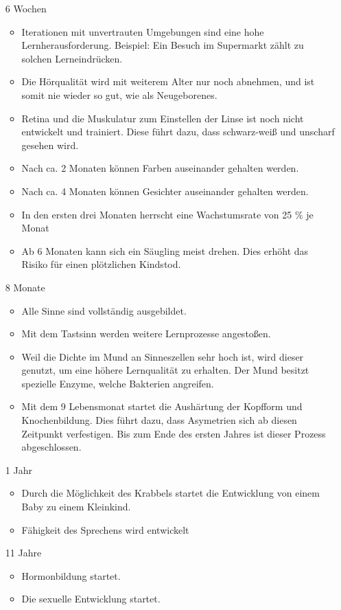 \begin{enumerate}
\begin{itemize}
\begin{itemize}
		\end{itemize}
	\end{itemize}
	\item[6 Wochen]
	\begin{itemize}
		\item Iterationen mit unvertrauten Umgebungen sind eine hohe Lernherausforderung. Beispiel: Ein Besuch im Supermarkt zählt zu solchen Lerneindrücken.
		\item Die Hörqualität wird mit weiterem Alter nur noch abnehmen, und ist somit nie wieder so gut, wie als Neugeborenes.
		\item Retina und die Muskulatur zum Einstellen der Linse ist noch nicht entwickelt und trainiert. Diese führt dazu, dass schwarz-weiß und unscharf gesehen wird.
		\item Nach ca. 2 Monaten können Farben auseinander gehalten werden.
		\item Nach ca. 4 Monaten können Gesichter auseinander gehalten werden.
		\item In den ersten drei Monaten herrscht eine Wachstumsrate von 25 $\%$ je Monat
		\item Ab 6 Monaten kann sich ein Säugling meist drehen. Dies erhöht das Risiko für einen plötzlichen Kindstod.
	\end{itemize}
	\item[8 Monate]
	\begin{itemize}
		\item Alle Sinne sind vollständig ausgebildet.
		\item Mit dem Tastsinn werden weitere Lernprozesse angestoßen.
		\item Weil die Dichte im Mund an Sinneszellen sehr hoch ist, wird dieser genutzt, um eine höhere Lernqualität zu erhalten. Der Mund besitzt spezielle Enzyme, welche Bakterien angreifen.
		\item Mit dem 9 Lebensmonat startet die Aushärtung der Kopfform und Knochenbildung. Dies führt dazu, dass Asymetrien sich ab diesen Zeitpunkt verfestigen. Bis zum Ende des ersten Jahres ist dieser Prozess abgeschlossen.
	\end{itemize}
	\item[1 Jahr]
	\begin{itemize}
		\item Durch die Möglichkeit des Krabbels startet die Entwicklung von einem Baby zu einem Kleinkind.
		\item Fähigkeit des Sprechens wird entwickelt
	\end{itemize}
	\item[11 Jahre]
	\begin{itemize}
		\item Hormonbildung startet.
		\item Die sexuelle Entwicklung startet.
	\end{itemize}
\end{enumerate}
